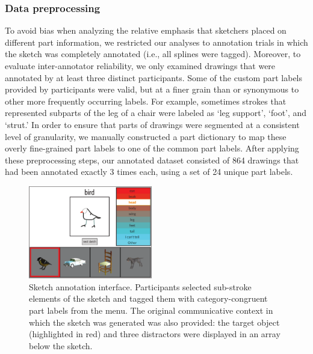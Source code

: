 \documentclass[10pt,letterpaper]{article}
\begin{document}
\subsubsection{Data preprocessing}

To avoid bias when analyzing the relative emphasis that sketchers placed on different part information, we restricted our analyses to annotation trials in which the sketch was completely annotated (i.e., all splines were tagged). 
Moreover, to evaluate inter-annotator reliability, we only examined drawings that were annotated by at least three distinct participants. 
Some of the custom part labels provided by participants were valid, but at a finer grain than or synonymous to other more frequently occurring labels. 
For example, sometimes strokes that represented subparts of the leg of a chair were labeled as `leg support', `foot', and `strut.'
In order to ensure that parts of drawings were segmented at a consistent level of granularity, we manually constructed a part dictionary to map these overly fine-grained part labels to one of the common part labels. 
After applying these preprocessing steps, our annotated dataset consisted of 864 drawings that had been annotated exactly 3 times each, using a set of 24 unique part labels. 

\begin{figure}[htbp]
\centering
\includegraphics[width=0.48\textwidth]{figures/4_annotation_interface.pdf}
\caption{Sketch annotation interface. Participants selected sub-stroke elements of the sketch and tagged them with category-congruent part labels from the menu. The original communicative context in which the sketch was generated was also provided: the target object (highlighted in red) and three distractors were displayed in an array below the sketch.}
\label{annotation_interface}
\end{figure}
\end{document}

